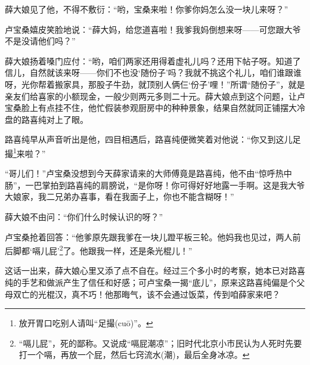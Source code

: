 \par 薛大娘见了他，不得不敷衍：“哟，宝桑来啦！你爹你妈怎么没一块儿来呀？”
\par 卢宝桑嬉皮笑脸地说：“薛大妈，给您道喜啦！我爹我妈倒想来呀——可您跟大爷不是没请他们吗？”
\par 薛大娘扬着嗓门应付：“哟，咱们两家还用得着虚礼儿吗？还用下帖子呀。知道了信儿，自然就该来呀——你们不也没‘随份子’吗？我就不挑这个礼儿，咱们谁跟谁呀，光你帮着搬家具，那股子牛劲，就顶别人俩仨‘份子’哩！”所谓“随份子”，就是亲友们给喜家的小额现金，一般少则两元多则二十元。薛大娘点到这个问题，让卢宝桑脸上有点挂不住，他忙假装参观厨房中的种种景象，结果自然就同正铺摆大冷盘的路喜纯对上了眼。
\par 路喜纯早从声音听出是他，四目相遇后，路喜纯便微笑着对他说：“你又到这儿足撮\footnote{放开胃口吃别人请叫“足撮(cuō)”。}来啦？”
\par “哥儿们！”卢宝桑没想到今天薛家请来的大师傅竟是路喜纯，他不由“惊呼热中肠”，一巴掌拍到路喜纯的肩膀说，“是你呀！你可得好好地露一手啊。这是我大爷大娘家，我二兄弟办喜事，看在我面子上，你也不能含糊呀！”
\par 薛大娘不由问：“你们什么时候认识的呀？”
\par 卢宝桑抢着回答：“他爹原先跟我爹在一块儿蹬平板三轮。他妈我也见过，两人前后脚都‘嗝儿屁’\footnote{“嗝儿屁”，死的鄙称。又说成“嗝屁潮凉”；旧时代北京小市民认为人死时先要打一个嗝，再放一个屁，然后七窍流水(潮)，最后全身冰凉。}了。他跟我一样，还是条光棍儿！”
\par 这话一出来，薛大娘心里又添了点不自在。经过三个多小时的考察，她本已对路喜纯的手艺和做派产生了信任和好感；可卢宝桑一揭“底儿”，原来这路喜纯偏是个父母双亡的光棍汉，真不巧！他那晦气，该不会通过饭菜，传到咱薛家来吧？
